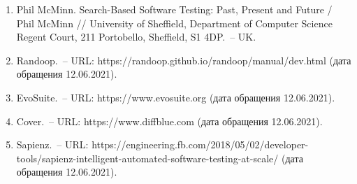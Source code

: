 \begin{enumerate}
\item Phil McMinn. Search-Based Software Testing: Past, Present and Future / Phil McMinn // University of Sheffield, Department of Computer Science Regent Court, 211 Portobello, Sheffield, S1 4DP.~-- UK.

\item Randoop.~-- URL: https://randoop.github.io/randoop/manual/dev.html (дата обращения 12.06.2021).

\item EvoSuite.~-- URL: https://www.evosuite.org (дата обращения 12.06.2021).

\item Cover.~-- URL: https://www.diffblue.com (дата обращения 12.06.2021).

\item Sapienz.~-- URL: https://engineering.fb.com/2018/05/02/developer-tools/sapienz-intelligent-automated-software-testing-at-scale/ (дата обращения 12.06.2021).


\end{enumerate}


